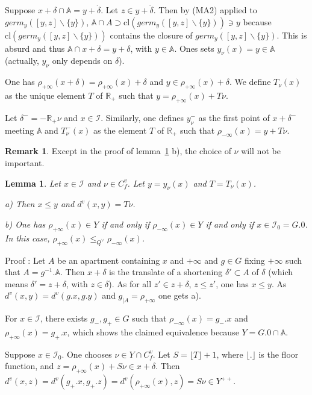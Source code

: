 \documentclass[12pt]{article}
\theoremstyle{plain}
\newtheorem{lemme}[thm]{Lemma}
\theoremstyle{definition}
\newtheorem{rque}[thm]{Remark}
\newcommand{\R}{\mathbb{R}}
\newcommand{\A}{\mathbb{A}}
\newcommand{\I}{\mathcal{I}}
\begin{document}
 Suppose $x+\delta\cap \A=y+\mathring{\delta}$. Let $z\in y+\mathring{\delta}$. Then by (MA2) applied to $germ_y([y,z]\backslash\{y\})$, $\A\cap A\supset \mathrm{cl}(germ_y([y,z]\backslash\{y\}))\ni y$ because $\mathrm{cl}(germ_y([y,z]\backslash\{y\}))$ contains the closure of $germ_y([y,z]\backslash\{y\})$. This is absurd and thus $\A\cap x+\delta=y+\delta$, with $y\in \A$. Ones sets $y_\nu(x)=y\in\A$ (actually, $y_\nu$ only depends on $\delta$).

One has $\rho_{+\infty}(x+\delta)=\rho_{+\infty}(x)+\delta$ and $y\in \rho_{+\infty}(x)+\delta$. We define $T_\nu(x)$ as the unique element $T$ of $\mathbb{R}_+$ such that $y=\rho_{+\infty}(x)+T\nu$.

Let $\delta^-=-\R_+\nu$ and $x\in \I$. Similarly, one defines $y_\nu^-$ as the first point of $x+\delta^-$ meeting $\A$ and $T^-_\nu(x)$ as the element $T$ of $\R_+$ such that $\rho_{-\infty}(x)=y+T\nu$.

\begin{rque}
Except in the proof of lemma~\ref{lemme distance vectorielle} b), the choice of $\nu$ will not be important.
\end{rque}


\begin{lemme}\label{lemme distance vectorielle}
Let $x\in \mathcal{I}$ and $\nu\in C_f^v$. Let $y=y_\nu(x)$ and $T=T_\nu(x)$.

a)  Then $x\leq y$ and $d^v(x,y)=T\nu$.

b) One has $\rho_{+\infty}(x)\in Y$ if and only if $\rho_{-\infty}(x)\in Y$ if and only if $x\in \mathcal I_0=G.0$. In this case, $\rho_{+\infty}(x)\leq_{Q^\vee} \rho_{-\infty}(x)$.


\end{lemme}

Proof : Let $A$ be an apartment containing $x$ and $+\infty$ and $g\in G$ fixing $+\infty$ such that $A=g^{-1}.\A$. Then $x+\delta$ is the translate of a shortening $\delta'\subset A$ of $\delta$ (which means $\delta'=z+\delta$, with $z\in \delta$). As for all $z'\in z+\delta$, $z\leq z'$, one has $x\leq y$. As $d^v(x,y)=d^v(g.x,g.y)$ and $g_{|A}=\rho_{+\infty}$ one gets a).

For $x\in\mathcal{I}$, there exists $g_-,g_+\in G$ such that $\rho_{-\infty}(x)=g_-.x$ and $\rho_{+\infty}(x)=g_+.x$, which shows the claimed equivalence because $Y=G.0\cap \mathbb{A}$.

Suppose $x\in \mathcal{I}_0$. One chooses $\nu\in Y\cap C_f^v$. Let $S=\lfloor T\rfloor +1$, where $\lfloor.\rfloor$ is the floor function, and $z=\rho_{+\infty}(x)+S\nu\in x+\delta$. Then $d^v(x,z)=d^v(g_+.x,g_+.z)=d^v(\rho_{+\infty}(x),z)=S\nu\in Y^{++}$.
\end{document}
